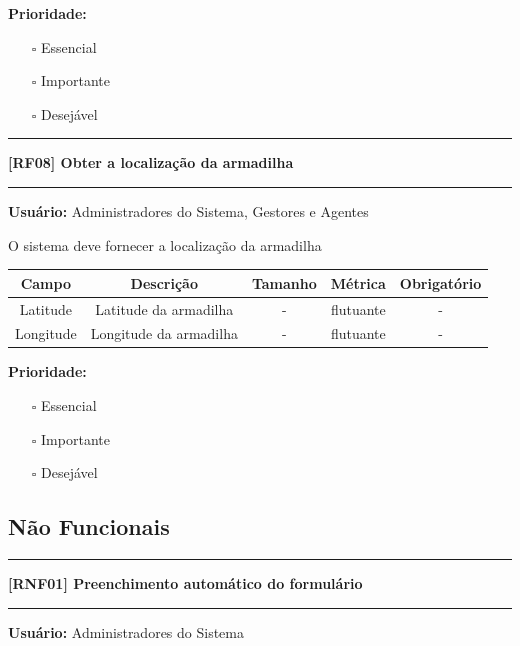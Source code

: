 	\textbf{Prioridade: }\begin{itemize}
		\item[\hspace{1cm}\rlap{\raisebox{0.2ex}{\hspace{0.4ex}\scriptsize \ding{56}}}$\square$]
		Essencial
		\item[\hspace{1cm}$\square$]
		Importante
		\item[\hspace{1cm}$\square$]
		Desejável
	\end{itemize}
	\begin{center}
		\noindent\rule{\textwidth}{0.4pt}
		\textbf{[RF08] Obter a localização da armadilha}
		\noindent\rule{\textwidth}{0.4pt}
	\end{center}
	\textbf{Usuário:} Administradores do Sistema, Gestores e Agentes
	
	O sistema deve fornecer a localização da armadilha
	
	\begin{center}
		\begin{adjustbox}{width=\textwidth}      \begin{tabular}{ |c|c|c|c|c| } 
			\hline
			\rowcolor{lightgray} Campo & Descrição & Tamanho & Métrica & Obrigatório \\
			\hline
			Latitude & Latitude da armadilha & - & flutuante & - \\ 
			\hline
			Longitude & Longitude da armadilha & - & flutuante & - \\ 
			\hline 
		\end{tabular}    \end{adjustbox}
	\end{center}
	
	\textbf{Prioridade: }\begin{itemize}
		\item[\hspace{1cm}\rlap{\raisebox{0.2ex}{\hspace{0.4ex}\scriptsize \ding{56}}}$\square$]
		Essencial
		\item[\hspace{1cm}$\square$]
		Importante
		\item[\hspace{1cm}$\square$]
		Desejável
	\end{itemize}
	
	\subsection*{Não Funcionais}
	\begin{center}
		\noindent\rule{\textwidth}{0.4pt}
		\textbf{[RNF01] Preenchimento automático do formulário}
		\noindent\rule{\textwidth}{0.4pt}
	\end{center}
	\textbf{Usuário:} Administradores do Sistema
	
